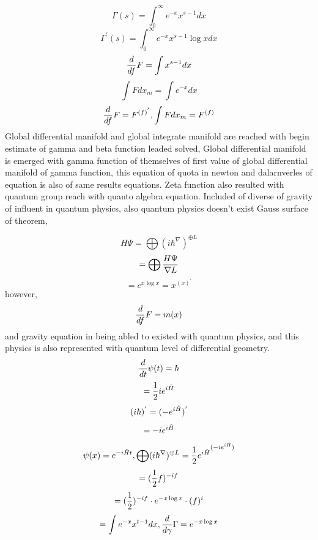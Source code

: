 \documentclass{jsarticle}
\begin{document}
    $$ \Gamma(s) = \int^{\infty}_{0} e^{-x}x^{s - 1}dx $$
    $$  \Gamma^{'}(s) = \int^{\infty}_{0} e^{-x}x^{s - 1} \log x dx $$
    $$ {d \over df}F = \int x^{s - 1}dx $$
    $$ \int F dx_m = \int e^{-x}dx $$
    $$ {d \over df}F = F^{(f)^{'}}, \int F dx_m = F^{(f)} $$
    Global differential manifold and global integrate manifold are
    reached with begin estimate of gamma and beta function leaded solved,
    Global differential manifold is emerged with gamma function of
    themselves of first value of global differential manifold of gamma
    function, this equation of quota in newton and dalarnverles of equation
    is also of same results equations. Zeta function also resulted with
    quantum group reach with quanto algebra equation.
        Included of diverse of gravity of influent in quantum physics,
    also quantum physics doesn't exist Gauss surface of theorem,
   
    $$ H \Psi = \bigoplus (i \hbar ^{\nabla})^{\oplus L} $$
    $$ = \bigoplus {{ H \Psi} \over \nabla L} $$
    $$ = e^{x \log x} = x^{(x)^{'}} $$
    however,
    $$ {d \over df}F = m(x) $$
    and gravity equation in being abled to existed with quantum physics,
    and this physics is also represented with quantum level of differential
    geometry.
    $$ {d \over dt}\psi(t) = \hbar $$
    $$ = {1 \over 2}i e^{i \Hat{H}} $$
    $$ (i \hbar)^{'} = (- e^{i \Hat{H}})^{'} $$
    $$ = - i e^{i \Hat{H}} $$
    $$ \psi(x) = e^{-i \Hat{H}t}, \bigoplus (i \hbar ^{\nabla})^{\oplus L} 
    = {{{1 \over 2} e^{i \Hat{H}}}^{(-i e^{i \Hat{H}})}} $$
    $$ = ({1 \over 2}f)^{-i f}$$
    $$ = ({1 \over 2})^{-i f} \cdot e^{-x \log x} \cdot (f)^{i} $$
    $$ = \int e^{- x} x^{t - 1}dx, {d \over d \gamma}\Gamma = e^{-x \log x}  $$
     
\end{document}

